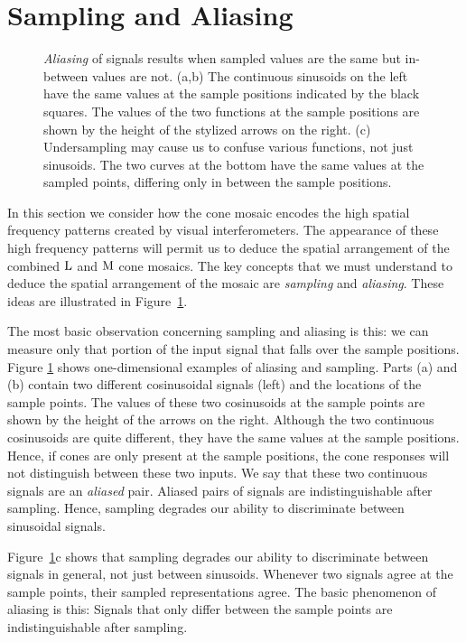 \section{Sampling and Aliasing}

\begin{figure}
\centerline{
}
\caption[Aliasing Examples]{
{\em Aliasing} of signals results when sampled values are
the same but in-between values are not.
(a,b) The continuous sinusoids on the left
have the same values at the sample positions indicated
by the black squares.
The values of the two functions at the sample positions
are shown by the height of the stylized arrows on the right.
(c) Undersampling may cause us to confuse various
functions, not just sinusoids.
The two curves at the bottom have the same values at the
sampled points, differing only in between the sample positions.
\label{f2:aliasing}
}
\end{figure}
In this section we
consider how the cone mosaic encodes
the high spatial frequency patterns created by visual interferometers.
The appearance of these high frequency patterns
will permit us to deduce the spatial arrangement of
the combined $\mbox{L}$ and $\mbox{M}$ cone mosaics.
The key concepts that we must understand to
deduce the spatial arrangement of the mosaic
are {\em sampling} and {\em aliasing}.
These ideas are illustrated in Figure~\ref{f2:aliasing}.

The most basic observation concerning sampling and aliasing is this:
we can measure only that portion of the input signal
that falls over the sample positions.
Figure \ref{f2:aliasing}
shows one-dimensional examples of aliasing and sampling.
Parts (a) and (b) contain two different cosinusoidal signals (left)
and the locations of the sample points.
The values of these two cosinusoids at the sample points
are shown by the height of the arrows on the right.
Although the two continuous cosinusoids are quite different,
they have the same values at the sample positions.
Hence, if cones are only present at the sample positions,
the cone responses will not distinguish
between these two inputs.
We say that these two continuous signals are an {\em aliased} pair.
Aliased pairs of signals
are indistinguishable after sampling.
Hence, sampling degrades our ability to discriminate between
sinusoidal signals.

Figure~\ref{f2:aliasing}c shows
that sampling degrades our ability to discriminate
between signals in general, not just between sinusoids.
Whenever two signals agree at the sample points,
their sampled representations agree.
The basic phenomenon of aliasing is this:
Signals that only differ between the sample points
are indistinguishable after sampling.

